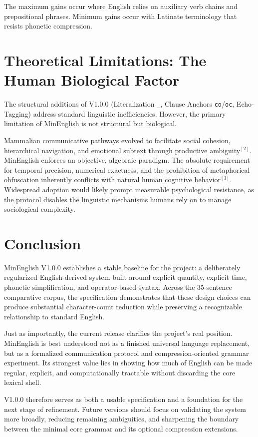 \documentclass[12pt,onecolumn,letterpaper]{article}
\newcommand{\me}[1]{\texttt{#1}}
\begin{document}
The maximum gains occur where English relies on auxiliary verb chains and
prepositional phrases. Minimum gains occur with Latinate terminology that
resists phonetic compression.

\section{Theoretical Limitations: The Human Biological Factor}

The structural additions of V1.0.0 (Literalization \me{\_}, Clause Anchors
\me{co}/\me{oc}, Echo-Tagging) address standard linguistic inefficiencies.
However, the primary limitation of MinEnglish is not structural but biological.

Mammalian communicative pathways evolved to facilitate social cohesion,
hierarchical navigation, and emotional subtext through productive
ambiguity$^{[2]}$. MinEnglish enforces an objective, algebraic paradigm.
The absolute requirement for temporal precision, numerical exactness, and
the prohibition of metaphorical obfuscation inherently conflicts with natural
human cognitive behavior$^{[3]}$. Widespread adoption would likely prompt
measurable psychological resistance, as the protocol disables the linguistic
mechanisms humans rely on to manage sociological complexity.

\section{Conclusion}

MinEnglish V1.0.0 establishes a stable baseline for the project: a deliberately
regularized English-derived system built around explicit quantity, explicit
time, phonetic simplification, and operator-based syntax. Across the 35-sentence
comparative corpus, the specification demonstrates that these design choices can
produce substantial character-count reduction while preserving a recognizable
relationship to standard English.

Just as importantly, the current release clarifies the project's real position.
MinEnglish is best understood not as a finished universal language replacement,
but as a formalized communication protocol and compression-oriented grammar
experiment. Its strongest value lies in showing how much of English can be made
regular, explicit, and computationally tractable without discarding the core
lexical shell.

V1.0.0 therefore serves as both a usable specification and a foundation for the
next stage of refinement. Future versions should focus on validating the system
more broadly, reducing remaining ambiguities, and sharpening the boundary between
the minimal core grammar and its optional compression extensions.
\end{document}
